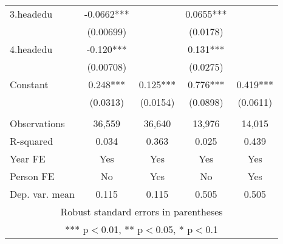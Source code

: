 \begin{tabular}{lcccc}
3.headedu & -0.0662*** &  & 0.0655*** &  \\
 & (0.00699) &  & (0.0178) &  \\
4.headedu & -0.120*** &  & 0.131*** &  \\
 & (0.00708) &  & (0.0275) &  \\
Constant & 0.248*** & 0.125*** & 0.776*** & 0.419*** \\
 & (0.0313) & (0.0154) & (0.0898) & (0.0611) \\
 &  &  &  &  \\
Observations & 36,559 & 36,640 & 13,976 & 14,015 \\
R-squared & 0.034 & 0.363 & 0.025 & 0.439 \\
Year FE & Yes & Yes & Yes & Yes \\
Person FE & No & Yes & No & Yes \\
 Dep. var. mean & 0.115 & 0.115 & 0.505 & 0.505 \\ \hline
\multicolumn{5}{c}{ Robust standard errors in parentheses} \\
\multicolumn{5}{c}{ *** p$<$0.01, ** p$<$0.05, * p$<$0.1} \\
\end{tabular}
